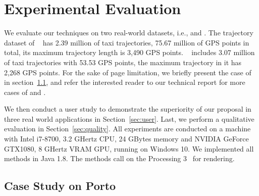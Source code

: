 \section{Experimental Evaluation}\label{sec:exp}
We evaluate our techniques on two real-world datasets, i.e., \pt{} and \sz{}. The trajectory dataset of \pt{}~\cite{pt} has 2.39 million of taxi trajectories, 75.67 million of GPS points in total, its maximum trajectory length is 3,490 GPS points. \sz{}~\cite{sz} includes 3.07 million of taxi trajectories with 53.53 GPS points, the maximum trajectory in it has 2,268 GPS points.
For the sake of page limitation, we briefly present the case of \pt{} in section~\ref{sec:case}, and refer the interested reader to our technical report \cite{techreport} for more cases of \pt{} and \sz{}.

We then conduct a user study to demonstrate the superiority of our proposal in three real world applications in Section~\ref{sec:user}.
Last, we perform a qualitative evaluation in Section~\ref{sec:quality}.
All experiments are conducted on a machine with Intel i7-8700, 3.2 GHertz CPU, 24 GBytes memory and NVIDIA GeForce GTX1080, 8 GHertz VRAM GPU, running on Windows 10.
We implemented all methods in Java 1.8. The methods call on the Processing 3~\cite{p3} for rendering.



\subsection{Case Study on Porto}\label{sec:case}


